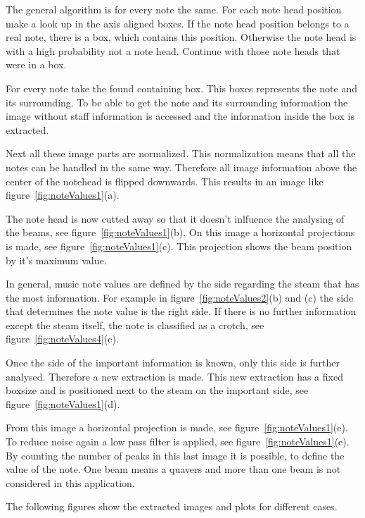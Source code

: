 The general algorithm is for every note the same. For each note head position make a look up in the axis aligned boxes. If the note head position belongs to a real note, there is a box, which contains this position. Otherwise the note head is with a high probability not a note head. Continue with those note heads that were in a box. 

For every note take the found containing box. This boxes represents the note and its surrounding. To be able to get the note and its surrounding information the image without staff information is accessed and the information inside the box is extracted. 

Next all these image parts are normalized. This normalization means that all the notes can be handled in the same way. Therefore all image information above the center of the notehead is flipped downwards. This results in an image like figure~\ref{fig:noteValues1}(a). 

The note head is now cutted away so that it doesn't inlfuence the analysing of the beams, see figure~\ref{fig:noteValues1}(b). On this image a horizontal projections is made, see figure~\ref{fig:noteValues1}(c). This projection shows the beam position by it's maximum value. 

In general, music note values are defined by the side regarding the steam that has the most information. For example in figure~\ref{fig:noteValues2}(b) and (c) the side that determines the note value is the right side. If there is no further information except the steam itself, the note is classified as a crotch, see figure~\ref{fig:noteValues4}(c).

Once the side of the important information is known, only this side is further analysed. Therefore a new extraction is made. This new extraction has a fixed boxsize and is positioned next to the steam on the important side, see figure~\ref{fig:noteValues1}(d).

From this image a horizontal projection is made, see figure~\ref{fig:noteValues1}(e). To reduce noise again a low pass filter is applied, see figure~\ref{fig:noteValues1}(e). By counting the number of peaks in this last image it is possible, to define the value of the note. One beam means a quavers and more than one beam is not considered in this application. 

The following figures show the extracted images and plots for different cases.


